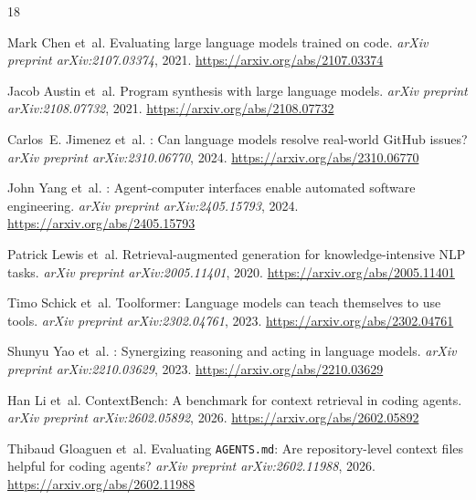 \documentclass[10pt,a4paper,twocolumn]{article}
\begin{document}
\begin{thebibliography}{18}

Mark Chen et~al.
\newblock Evaluating large language models trained on code.
\newblock \emph{arXiv preprint arXiv:2107.03374}, 2021.
\newblock \url{https://arxiv.org/abs/2107.03374}

Jacob Austin et~al.
\newblock Program synthesis with large language models.
\newblock \emph{arXiv preprint arXiv:2108.07732}, 2021.
\newblock \url{https://arxiv.org/abs/2108.07732}

Carlos~E. Jimenez et~al.
: Can language models resolve real-world {GitHub} issues?
\newblock \emph{arXiv preprint arXiv:2310.06770}, 2024.
\newblock \url{https://arxiv.org/abs/2310.06770}

John Yang et~al.
: Agent-computer interfaces enable automated software
    engineering.
\newblock \emph{arXiv preprint arXiv:2405.15793}, 2024.
\newblock \url{https://arxiv.org/abs/2405.15793}

Patrick Lewis et~al.
\newblock Retrieval-augmented generation for knowledge-intensive {NLP} tasks.
\newblock \emph{arXiv preprint arXiv:2005.11401}, 2020.
\newblock \url{https://arxiv.org/abs/2005.11401}

Timo Schick et~al.
\newblock Toolformer: Language models can teach themselves to use tools.
\newblock \emph{arXiv preprint arXiv:2302.04761}, 2023.
\newblock \url{https://arxiv.org/abs/2302.04761}

Shunyu Yao et~al.
: Synergizing reasoning and acting in language models.
\newblock \emph{arXiv preprint arXiv:2210.03629}, 2023.
\newblock \url{https://arxiv.org/abs/2210.03629}

Han Li et~al.
\newblock ContextBench: A benchmark for context retrieval in coding agents.
\newblock \emph{arXiv preprint arXiv:2602.05892}, 2026.
\newblock \url{https://arxiv.org/abs/2602.05892}

Thibaud Gloaguen et~al.
\newblock Evaluating \texttt{AGENTS.md}: Are repository-level context files
    helpful for coding agents?
\newblock \emph{arXiv preprint arXiv:2602.11988}, 2026.
\newblock \url{https://arxiv.org/abs/2602.11988}


\end{thebibliography}
\end{document}
